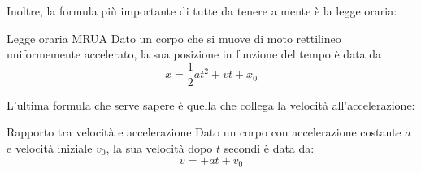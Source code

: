 Inoltre, la formula più importante di tutte da tenere a mente è la legge oraria:
\begin{definizione}{Legge oraria MRUA}
	Dato un corpo che si muove di moto rettilineo uniformemente accelerato, la sua posizione in funzione del tempo è data da
	\[
		x = \frac{1}{2} a t^2 + vt + x_0
	\]
\end{definizione}
L'ultima formula che serve sapere è quella che collega la velocità all'accelerazione:
\begin{definizione}{Rapporto tra velocità e accelerazione}
	Dato un corpo con accelerazione costante $ a $ e velocità iniziale $ v_0 $, la sua velocità dopo $ t $ secondi è data da:
	\[
		v = + at + v_0
	\]
\end{definizione}

